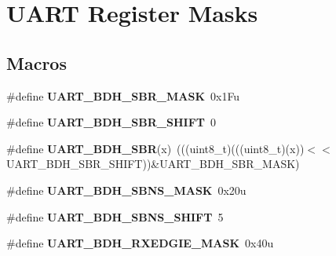 \hypertarget{group___u_a_r_t___register___masks}{}\section{U\+A\+RT Register Masks}
\label{group___u_a_r_t___register___masks}
\subsection*{Macros}
\begin{DoxyCompactItemize}
\item 
\mbox{\label{group___u_a_r_t___register___masks_ga2680dc8176b0c933b4a1b77c5dbb64b7}} 
\#define {\bfseries U\+A\+R\+T\+\_\+\+B\+D\+H\+\_\+\+S\+B\+R\+\_\+\+M\+A\+SK}~0x1\+Fu
\item 
\mbox{\label{group___u_a_r_t___register___masks_gac38d8a98be282d97c4837597a6c02cda}} 
\#define {\bfseries U\+A\+R\+T\+\_\+\+B\+D\+H\+\_\+\+S\+B\+R\+\_\+\+S\+H\+I\+FT}~0
\item 
\mbox{\label{group___u_a_r_t___register___masks_ga7d337242135cdbd812b7da47758fbdb6}} 
\#define {\bfseries U\+A\+R\+T\+\_\+\+B\+D\+H\+\_\+\+S\+BR}(x)~(((uint8\+\_\+t)(((uint8\+\_\+t)(x))$<$$<$U\+A\+R\+T\+\_\+\+B\+D\+H\+\_\+\+S\+B\+R\+\_\+\+S\+H\+I\+FT))\&U\+A\+R\+T\+\_\+\+B\+D\+H\+\_\+\+S\+B\+R\+\_\+\+M\+A\+SK)
\item 
\mbox{\label{group___u_a_r_t___register___masks_ga727c0ef3199f627c85fc740265d5134d}} 
\#define {\bfseries U\+A\+R\+T\+\_\+\+B\+D\+H\+\_\+\+S\+B\+N\+S\+\_\+\+M\+A\+SK}~0x20u
\item 
\mbox{\label{group___u_a_r_t___register___masks_ga4d6023b67150b98ef12dba445f773109}} 
\#define {\bfseries U\+A\+R\+T\+\_\+\+B\+D\+H\+\_\+\+S\+B\+N\+S\+\_\+\+S\+H\+I\+FT}~5
\item 
\mbox{\label{group___u_a_r_t___register___masks_ga0882debd8f2c52d4ab8461b22b6519d9}} 
\#define {\bfseries U\+A\+R\+T\+\_\+\+B\+D\+H\+\_\+\+R\+X\+E\+D\+G\+I\+E\+\_\+\+M\+A\+SK}~0x40u
\item 
$$
\end{DoxyCompactItemize}
